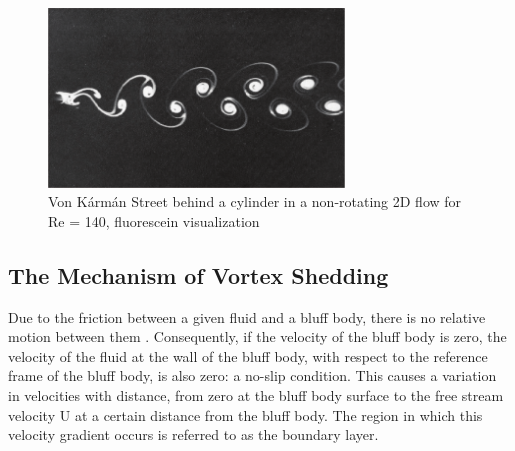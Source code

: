 \begin{figure}[htbp]
	\centering
	\includegraphics[width=0.7\textwidth]{images/vonKarmanStreet.png}
	\caption{Von Kármán Street behind a cylinder in a non-rotating 2D flow for Re = 140, fluorescein visualization \parencite[144]{ilieva2017turbulence}}
	\label{fig:vonKarmanStreet}
\end{figure}
\subsection{The Mechanism of Vortex Shedding}
Due to the friction between a given fluid and a bluff body, there is no relative motion between them \parencite{boundaryLayerTheory_2018, jeff_defoe_bluff_2020}. Consequently, if the velocity of the bluff body is zero, the velocity of the fluid at the wall of the bluff body, with respect to the reference frame of the bluff body, is also zero: a no-slip condition. This causes a variation in velocities with distance, from zero at the bluff body surface to the free stream velocity U at a certain distance from the bluff body. The region in which this velocity gradient occurs is referred to as the boundary layer.


